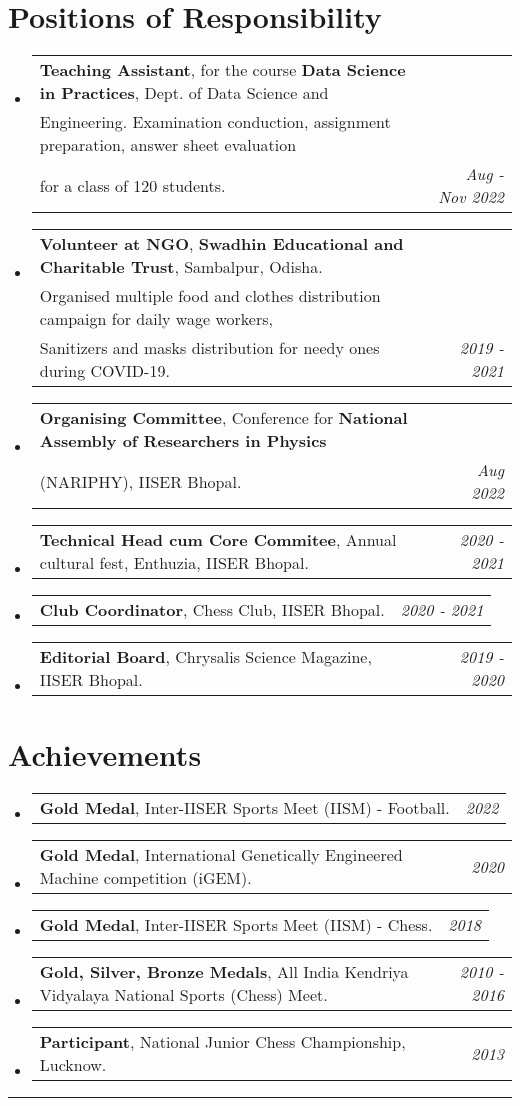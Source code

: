 \documentclass[a4paper,11pt]{article}
\makeatletter
\newcommand{\resumePOR}[3]{
\vspace{0.5mm}\item
    \begin{tabular*}{0.97\textwidth}[t]{l@{\extracolsep{\fill}}r}
        \textbf{#1}, \hspace{0.3mm}#2 & \textit{\small{#3}} 
    \end{tabular*}
    \vspace{-2mm}
}
\newcommand{\resumeSubHeadingListStart}{\begin{itemize}[leftmargin=*,labelsep=0mm]}
\newcommand{\resumeSubHeadingListEnd}{\end{itemize}}
\makeatother
\begin{document}
\section{Positions of Responsibility}
\resumeSubHeadingListStart
\resumePOR{Teaching Assistant} %
    {for the course \textbf{Data Science in Practices}, Dept. of Data Science and \\Engineering.
    Examination conduction, assignment preparation, answer sheet evaluation \\for a class of 120 students.} %
    {Aug - Nov 2022} %
\resumePOR{Volunteer at NGO} %
    {\textbf{Swadhin Educational and Charitable Trust}, Sambalpur, Odisha. \\
    Organised multiple food and clothes distribution campaign for daily wage workers,\\
    Sanitizers and masks distribution for needy ones during COVID-19.} %
    {2019 - 2021} %
\resumePOR{Organising Committee} %
    {Conference for \textbf{National Assembly of Researchers in Physics} \\(NARIPHY), IISER Bhopal.} %
    {Aug 2022} %
\resumePOR{Technical Head cum Core Commitee} %
    {Annual cultural fest, Enthuzia, IISER Bhopal.} %
    {2020 - 2021} %
\resumePOR{Club Coordinator} %
    {Chess Club, IISER Bhopal.} %
    {2020 - 2021} %
\resumePOR{Editorial Board} %
    {Chrysalis Science Magazine, IISER Bhopal.} %
    {2019 - 2020} %
\resumeSubHeadingListEnd


\vspace{1 mm}
\section{Achievements}
\resumeSubHeadingListStart
\resumePOR{Gold Medal} %
    {Inter-IISER Sports Meet (IISM) - Football.} %
    {2022} %
    
\resumePOR{Gold Medal} %
    {International Genetically Engineered Machine competition (iGEM).} %
    {2020} %

\resumePOR{Gold Medal} %
    {Inter-IISER Sports Meet (IISM) - Chess.} %
    {2018} %

\resumePOR{Gold, Silver, Bronze Medals} %
    {All India Kendriya Vidyalaya National Sports (Chess) Meet.} %
    {2010 - 2016} %

\resumePOR{Participant} %
    {National Junior Chess Championship, Lucknow.} %
    {2013} %

\resumeSubHeadingListEnd

\hspace*{-5mm}\rule{1.035\textwidth}{0.1mm}

\end{document}
